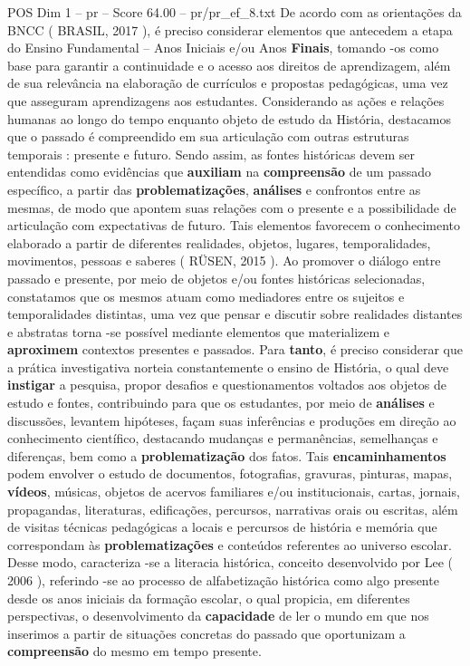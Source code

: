 \begin{textsample}{POS Dim 1 – pr – Score 64.00 – pr/pr\_ef\_8.txt}
De acordo com as orientações da BNCC ( BRASIL, 2017 ), é preciso considerar elementos que antecedem a etapa do Ensino Fundamental – Anos Iniciais e/ou Anos \textbf{Finais}, tomando -os como base para garantir a continuidade e o acesso aos direitos de aprendizagem, além de sua relevância na elaboração de currículos e propostas pedagógicas, uma vez que asseguram aprendizagens aos estudantes.
Considerando as ações e relações humanas ao longo do tempo enquanto objeto de estudo da História, destacamos que o passado é compreendido em sua articulação com outras estruturas temporais : presente e futuro.
Sendo assim, as fontes históricas devem ser entendidas como evidências que \textbf{auxiliam} na \textbf{compreensão} de um passado específico, a partir das \textbf{problematizações}, \textbf{análises} e confrontos entre as mesmas, de modo que apontem suas relações com o presente e a possibilidade de articulação com expectativas de futuro.
Tais elementos favorecem o conhecimento elaborado a partir de diferentes realidades, objetos, lugares, temporalidades, movimentos, pessoas e saberes ( RÜSEN, 2015 ).
Ao promover o diálogo entre passado e presente, por meio de objetos e/ou fontes históricas selecionadas, constatamos que os mesmos atuam como mediadores entre os sujeitos e temporalidades distintas, uma vez que pensar e discutir sobre realidades distantes e abstratas torna -se possível mediante elementos que materializem e \textbf{aproximem} contextos presentes e passados.
Para \textbf{tanto}, é preciso considerar que a prática investigativa norteia constantemente o ensino de História, o qual deve \textbf{instigar} a pesquisa, propor desafios e questionamentos voltados aos objetos de estudo e fontes, contribuindo para que os estudantes, por meio de \textbf{análises} e discussões, levantem hipóteses, façam suas inferências e produções em direção ao conhecimento científico, destacando mudanças e permanências, semelhanças e diferenças, bem como a \textbf{problematização} dos fatos.
Tais \textbf{encaminhamentos} podem envolver o estudo de documentos, fotografias, gravuras, pinturas, mapas, \textbf{vídeos}, músicas, objetos de acervos familiares e/ou institucionais, cartas, jornais, propagandas, literaturas, edificações, percursos, narrativas orais ou escritas, além de visitas técnicas pedagógicas a locais e percursos de história e memória que correspondam às \textbf{problematizações} e conteúdos referentes ao universo escolar.
Desse modo, caracteriza -se a literacia histórica, conceito desenvolvido por Lee ( 2006 ), referindo -se ao processo de alfabetização histórica como algo presente desde os anos iniciais da formação escolar, o qual propicia, em diferentes perspectivas, o desenvolvimento da \textbf{capacidade} de ler o mundo em que nos inserimos a partir de situações concretas do passado que oportunizam a \textbf{compreensão} do mesmo em tempo presente.

\end{textsample}
